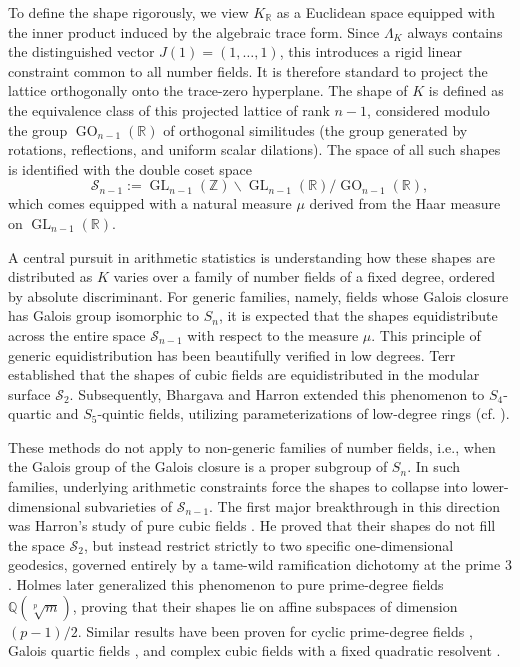 \documentclass{amsart}
\newcommand{\op}[1]{\operatorname{#1}}
\theoremstyle{plain}
\theoremstyle{definition}
\theoremstyle{remark}
\numberwithin{equation}{section}
\begin{document}
To define the shape rigorously, we view $K_{\mathbb{R}}$ as a Euclidean space equipped with the inner product induced by the algebraic trace form. Since $\Lambda_K$ always contains the distinguished vector $J(1) = (1, \dots, 1)$, this introduces a rigid linear constraint common to all number fields. It is therefore standard to project the lattice orthogonally onto the trace-zero hyperplane. The shape of $K$ is defined as the equivalence class of this projected lattice of rank $n-1$, considered modulo the group $\op{GO}_{n-1}(\mathbb{R})$ of orthogonal similitudes (the group generated by rotations, reflections, and uniform scalar dilations). The space of all such shapes is identified with the double coset space
\[
    \mathcal{S}_{n-1} := \op{GL}_{n-1}(\mathbb{Z}) \backslash \op{GL}_{n-1}(\mathbb{R}) / \op{GO}_{n-1}(\mathbb{R}),
\]
which comes equipped with a natural measure $\mu$ derived from the Haar measure on $\op{GL}_{n-1}(\mathbb{R})$.

A central pursuit in arithmetic statistics is understanding how these shapes are distributed as $K$ varies over a family of number fields of a fixed degree, ordered by absolute discriminant. For generic families, namely, fields whose Galois closure has Galois group isomorphic to $S_n$, it is expected that the shapes equidistribute across the entire space $\mathcal{S}_{n-1}$ with respect to the measure $\mu$. This principle of generic equidistribution has been beautifully verified in low degrees. Terr \cite{Terr97} established that the shapes of cubic fields are equidistributed in the modular surface $\mathcal{S}_2$. Subsequently, Bhargava and Harron \cite{BH16} extended this phenomenon to $S_4$-quartic and $S_5$-quintic fields, utilizing parameterizations of low-degree rings (cf. \cite{HighercompositionIII, HighercompositionIV}).

\par These methods do not apply to non-generic families of number fields, i.e., when the Galois group of the Galois closure is a proper subgroup of $S_n$. In such  families, underlying arithmetic constraints force the shapes to collapse into lower-dimensional subvarieties of $\mathcal{S}_{n-1}$. The first major breakthrough in this direction was Harron's study of pure cubic fields \cite{Har17}. He proved that their shapes do not fill the space $\mathcal{S}_2$, but instead restrict strictly to two specific one-dimensional geodesics, governed entirely by a tame-wild ramification dichotomy at the prime $3$. Holmes \cite{Holmes} later generalized this phenomenon to pure prime-degree fields $\mathbb{Q}(\sqrt[p]{m})$, proving that their shapes lie on affine subspaces of dimension $(p-1)/2$. Similar results have been proven for cyclic prime-degree fields \cite{MSM16}, Galois quartic fields \cite{harronharrongaloisquartic}, and complex cubic fields with a fixed quadratic resolvent \cite{HarronANT}.
\end{document}
